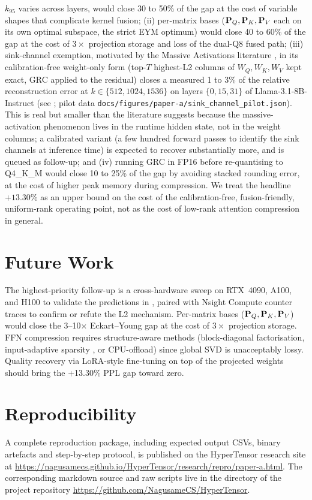 \documentclass[11pt]{article}
\begin{document}
\begin{itemize}
$k_{95}$ varies across layers, would close 30 to 50\% of the gap at the
cost of variable shapes that complicate kernel fusion; (ii) per-matrix
bases ($\mathbf{P}_Q,\mathbf{P}_K,\mathbf{P}_V$ each on its own optimal subspace, the
strict EYM optimum) would close 40 to 60\% of the gap at the cost of
$3\times$ projection storage and loss of the dual-Q8 fused path; (iii)
sink-channel exemption, motivated by the Massive Activations literature
\cite{sun2024massive}, in its calibration-free weight-only form
(top-$T$ highest-L2 columns of $W_Q,W_K,W_V$ kept exact, GRC applied to
the residual) closes a measured 1 to 3\% of the relative reconstruction
error at $k\in\{512,1024,1536\}$ on layers $\{0,15,31\}$ of
Llama-3.1-8B-Instruct (see ; pilot data
\texttt{docs/figures/paper-a/sink\_channel\_pilot.json}). This is real
but smaller than the literature suggests because the massive-activation
phenomenon lives in the runtime hidden state, not in the weight
columns; a calibrated variant (a few hundred forward passes to identify
the sink channels at inference time) is expected to recover
substantially more, and is queued as follow-up; and (iv) running GRC in
FP16 before re-quantising to Q4\_K\_M would close 10 to 25\% of the gap
by avoiding stacked rounding error, at the cost of higher peak memory
during compression. We treat the headline $+13.30\%$ as an upper bound
on the cost of the calibration-free, fusion-friendly, uniform-rank
operating point, not as the cost of low-rank attention compression in
general.
\end{itemize}

\section{Future Work}
\label{sec:future}
The highest-priority follow-up is a cross-hardware sweep on RTX~4090, A100,
and H100 to validate the predictions in , paired with
Nsight Compute counter traces to confirm or refute the L2 mechanism.
Per-matrix bases ($\mathbf{P}_Q,\mathbf{P}_K,\mathbf{P}_V$) would close the
3--10$\times$ Eckart--Young gap at the cost of $3\times$ projection storage.
FFN compression requires structure-aware methods (block-diagonal
factorisation, input-adaptive sparsity \cite{elhage2022superposition},
or CPU-offload) since global SVD is unacceptably lossy.  Quality recovery via
LoRA-style \cite{hu2021lora} fine-tuning on top of the projected weights
should bring the +13.30\% PPL gap toward zero.

\section{Reproducibility}
A complete reproduction package, including expected output CSVs,
binary artefacts and step-by-step protocol, is published on the
HyperTensor research site at
\url{https://nagusamecs.github.io/HyperTensor/research/repro/paper-a.html}.
The corresponding markdown source and raw scripts live in the
 directory of the project repository
\url{https://github.com/NagusameCS/HyperTensor}.
\end{document}
